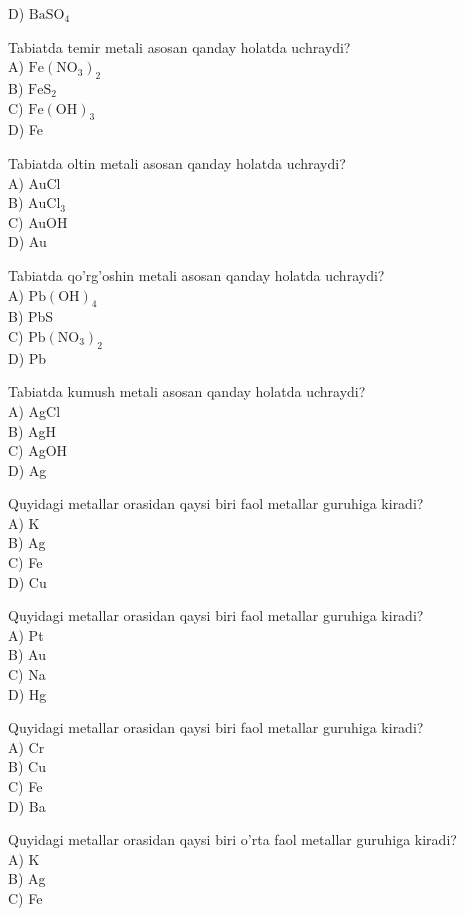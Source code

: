D) $\mathrm{BaSO}_{4}$
  \item Tabiatda temir metali asosan qanday holatda uchraydi?\\
A) $\mathrm{Fe}\left(\mathrm{NO}_{3}\right)_{2}$\\
B) $\mathrm{FeS}_{2}$\\
C) $\mathrm{Fe}(\mathrm{OH})_{3}$\\
D) Fe
  \item Tabiatda oltin metali asosan qanday holatda uchraydi?\\
A) AuCl\\
B) $\mathrm{AuCl}_{3}$\\
C) AuOH\\
D) Au
  \item Tabiatda qo'rg'oshin metali asosan qanday holatda uchraydi?\\
A) $\mathrm{Pb}(\mathrm{OH})_{4}$\\
B) PbS\\
C) $\mathrm{Pb}\left(\mathrm{NO}_{3}\right)_{2}$\\
D) Pb
  \item Tabiatda kumush metali asosan qanday holatda uchraydi?\\
A) AgCl\\
B) AgH\\
C) AgOH\\
D) Ag
  \item Quyidagi metallar orasidan qaysi biri faol metallar guruhiga kiradi?\\
A) K\\
B) Ag\\
C) Fe\\
D) Cu
  \item Quyidagi metallar orasidan qaysi biri faol metallar guruhiga kiradi?\\
A) Pt\\
B) Au\\
C) Na\\
D) Hg
  \item Quyidagi metallar orasidan qaysi biri faol metallar guruhiga kiradi?\\
A) Cr\\
B) Cu\\
C) Fe\\
D) Ba
  \item Quyidagi metallar orasidan qaysi biri o'rta faol metallar guruhiga kiradi?\\
A) K\\
B) Ag\\
C) Fe\\
